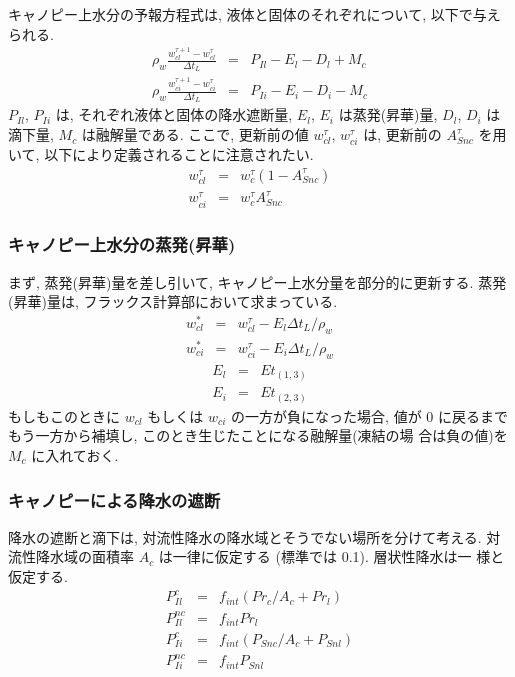 キャノピー上水分の予報方程式は, 液体と固体のそれぞれについて, 以下で与え
られる.
\begin{eqnarray}
 \rho_w \frac{w_{cl}^{\tau+1} - w_{cl}^{\tau}}{\Delta t_L}
  &=& P_{Il} - E_l - D_l + M_c \\
 \rho_w \frac{w_{ci}^{\tau+1} - w_{ci}^{\tau}}{\Delta t_L}
  &=& P_{Ii} - E_i - D_i - M_c
\end{eqnarray}
$P_{Il}$, $P_{Ii}$ は, それぞれ液体と固体の降水遮断量,
$E_l$, $E_i$ は蒸発(昇華)量,
$D_l$, $D_i$ は滴下量,
$M_c$ は融解量である.
ここで, 更新前の値 $w_{cl}^{\tau}$, $w_{ci}^{\tau}$ は, 更新前の
$A_{Snc}^{\tau}$ を用いて, 以下により定義されることに注意されたい.
\begin{eqnarray}
 w_{cl}^{\tau} &=& w_c^{\tau} ( 1 - A_{Snc}^{\tau}) \\
 w_{ci}^{\tau} &=& w_c^{\tau} A_{Snc}^{\tau}
\end{eqnarray}

\subsubsection{キャノピー上水分の蒸発(昇華)}

まず, 蒸発(昇華)量を差し引いて, キャノピー上水分量を部分的に更新する.
蒸発(昇華)量は, フラックス計算部において求まっている.
\begin{eqnarray}
 w_{cl}^* &=& w_{cl}^{\tau} - E_l \Delta t_L / \rho_w \\
 w_{ci}^* &=& w_{ci}^{\tau} - E_i \Delta t_L / \rho_w
\end{eqnarray}
\begin{eqnarray}
 E_l &=& Et_{(1,3)} \\
 E_i &=& Et_{(2,3)}
\end{eqnarray}
もしもこのときに $w_{cl}$ もしくは $w_{ci}$ の一方が負になった場合, 値が
0 に戻るまでもう一方から補填し, このとき生じたことになる融解量(凍結の場
合は負の値)を $M_c$ に入れておく.

\subsubsection{キャノピーによる降水の遮断}

降水の遮断と滴下は, 対流性降水の降水域とそうでない場所を分けて考える. 対
流性降水域の面積率 $A_c$ は一律に仮定する (標準では 0.1). 層状性降水は一
様と仮定する.
\begin{eqnarray}
 P_{Il}^{c}  &=& f_{int} ( Pr_c / A_c + Pr_l ) \\
 P_{Il}^{nc} &=& f_{int} Pr_l \\
 P_{Ii}^{c}  &=& f_{int} ( P_{Snc} / A_c + P_{Snl} ) \\
 P_{Ii}^{nc} &=& f_{int} P_{Snl}
\end{eqnarray}

